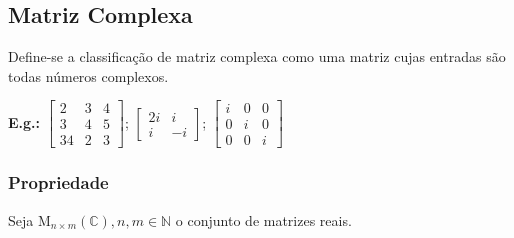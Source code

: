 \documentclass[a4paper,12pt]{article}
\begin{document}
\subsection{Matriz Complexa}

Define-se a classificação de matriz complexa como uma matriz cujas entradas são todas números complexos.

\textbf{E.g.:} $ \begin{bmatrix}
2 & 3 & 4\\
3 & 4 & 5\\
34 & 2 & 3
\end{bmatrix} $; $ \begin{bmatrix}
2i & i\\
i & -i
\end{bmatrix} $; $ \begin{bmatrix}
i & 0 & 0\\
0 & i & 0\\
0 & 0 & i
\end{bmatrix} $

\subsubsection{Propriedade}

Seja $ \text{M}_{n \times m} (\mathbb{C}), n,m \in \mathbb{N} $ o conjunto de matrizes reais.
\end{document}
